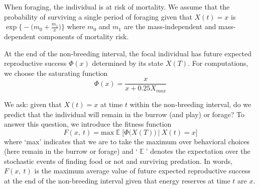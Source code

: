 \documentclass[12pt, letterpaper, fleqn]{article}
\DeclareMathOperator{\E}{\mathbb{E}}
\begin{document}
 
	When foraging, the individual is at risk of mortality. 
	We assume that the probability of surviving a single period of foraging given that $X(t)=x$ is $\exp\Big\{-\big(m_0+\frac{m_1}{x}\big)\Big\}$ where $m_0$ and $m_1$ are the mass-independent and mass-dependent components of mortality risk.
	
	
	At the end of the non-breeding interval, the focal individual has future expected reproductive success $\Phi(x)$ determined by its state $X(T)$. 
	For computations, we choose the saturating function
	\begin{equation}
	\Phi(x)=\frac{x}{x+0.25X_{max}}
	\end{equation} 

	
	We ask: given that $X(t)=x$ at  time $t$ within the non-breeding interval, do we predict that the individual will remain in the burrow (and play) or forage?  
	To answer this question, we introduce the fitness function
	\begin{equation}
	F(x,~t) =\text{max}\E\Big[\Phi\big(X(T)\big)~\big|~X(t)=x\Big]
	\end{equation}
	where `max' indicates that we are to take the maximum over behavioral choices (here remain in the burrow or forage) and `$\E$' denotes the expectation over the stochastic events of finding food or not and surviving predation.  
	In words, $F(x,~t)$ is the maximum average value of future expected reproductive success at the end of the non-breeding interval given that  energy reserves at time $t$ are $x$.
	
	
\end{document}
